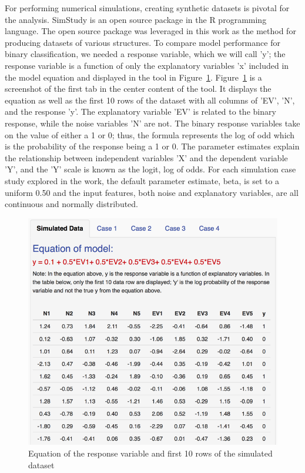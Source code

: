 \documentclass{llncs}
\begin{document}
For performing numerical simulations, creating synthetic datasets is pivotal for the analysis. SimStudy is an open source package in the R programming language. The open source package was leveraged in this work as the method for producing datasets of various structures. To compare model performance for binary classification, we needed a response variable, which we will call 'y'; the response variable is a function of only the explanatory variables 'x' included in the model equation and displayed in the tool in Figure~\ref{fig:dataset}.  Figure~\ref{fig:dataset} is a screenshot of the first tab in the center content of the tool.  It displays the equation as well as the first 10 rows of the dataset with all columns of 'EV', 'N', and the response 'y'. The explanatory variable 'EV' is related to the binary response, while the noise variables 'N' are not. The binary response variables take on the value of either a 1 or 0; thus, the formula represents the log of odd which is the probability of the response being a 1 or 0. The parameter estimates explain the relationship between independent variables 'X' and the dependent variable 'Y', and the 'Y' scale is known as the logit, log of odds. For each simulation case study explored in the work, the default parameter estimate, beta, is set to a uniform 0.50 and the input features, both noise and explanatory variables, are all continuous and normally distributed. 

\begin{figure}
\centering
\includegraphics[scale=0.75]{dataset.png}
\caption{Equation of the response variable and first 10 rows of the simulated dataset}
\label{fig:dataset}
\end{figure}
\end{document}
